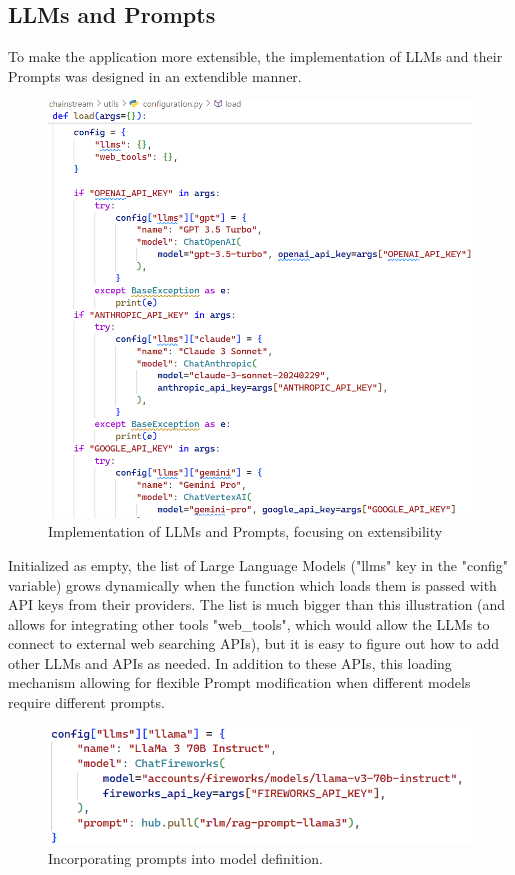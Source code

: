 \subsection{LLMs and Prompts}
To make the application more extensible, the implementation of LLMs and their Prompts was designed in an extendible manner.
\begin{figure}[htbp]
    \centering
    \includegraphics[width=\linewidth]{./figures/llms-implementation.png}
    \caption{Implementation of LLMs and Prompts, focusing on extensibility}
\end{figure}\newline
Initialized as empty, the list of Large Language Models ("llms" key in the "config" variable) grows dynamically when the function which loads them is passed with API keys from their providers.\newline
The list is much bigger than this illustration (and allows for integrating other tools "web\_tools", which would allow the LLMs to connect to external web searching APIs), but it is easy to figure out how to add other LLMs and APIs as needed.\newline
In addition to these APIs, this loading mechanism allowing for flexible Prompt modification when different models require different prompts.
\begin{figure}[htbp]
    \centering
    \includegraphics[width=\linewidth]{./figures/prompt-template-impl.png}
    \caption{Incorporating prompts into model definition.}
\end{figure}\newline
